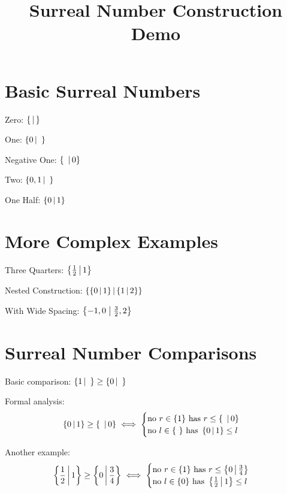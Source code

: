 \documentclass{article}
\begin{document}
\title{Surreal Number Construction Demo}
\maketitle

\section{Basic Surreal Numbers}

Zero: $\surrealzero$

One: $\surreal{0}{\ }$

Negative One: $\surreal{\ }{0}$

Two: $\surreal{0,1}{\ }$

One Half: $\surreal{0}{1}$

\section{More Complex Examples}

Three Quarters: $\surreal{\frac{1}{2}}{1}$

Nested Construction: $\surreal{\surreal{0}{1}}{\surreal{1}{2}}$

With Wide Spacing: $\surrealwide{-1, 0}{\frac{3}{2}, 2}$

\section{Surreal Number Comparisons}

Basic comparison: $\surrealgeqsimple{1}{\  }{0}{\  }$

Formal analysis:
$$\surrealgeq{0}{1}{\  }{0}$$

Another example:
$$\surrealgeq{\frac{1}{2}}{1}{0}{\frac{3}{4}}$$
\end{document}
